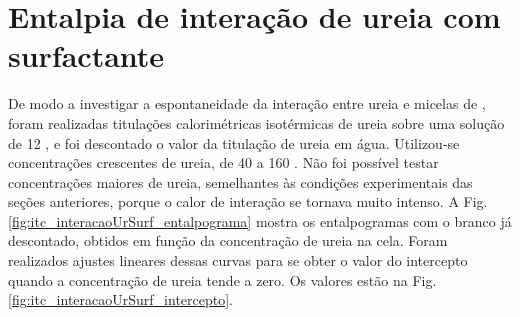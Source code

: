

%
\FloatBarrier
\section{Entalpia de interação de ureia com surfactante}

	De modo a investigar a espontaneidade da interação entre ureia e micelas de \TTAB{}, foram realizadas titulações calorimétricas isotérmicas de ureia sobre uma solução de \TTAB{} 12 \mM, e foi descontado o valor da titulação de ureia em água. Utilizou-se concentrações crescentes de ureia, de 40 a 160 \mM. Não foi possível testar concentrações maiores de ureia, semelhantes às condições experimentais das seções anteriores, porque o calor de interação se tornava muito intenso. A Fig. \ref{fig:itc_interacaoUrSurf_entalpograma} mostra os entalpogramas com o branco já descontado, obtidos em função da concentração de ureia na cela. Foram realizados ajustes lineares  dessas curvas para se obter o valor do intercepto quando a concentração de ureia tende a zero. Os valores estão na Fig. \ref{fig:itc_interacaoUrSurf_intercepto}.
	


